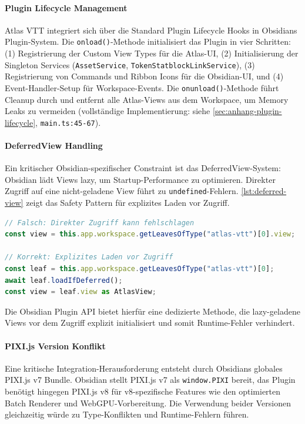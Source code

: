 \paragraph{Plugin Lifecycle Management}

Atlas \ac{VTT} integriert sich über die Standard Plugin Lifecycle Hooks in Obsidians Plugin-System. Die \texttt{onload()}-Methode initialisiert das Plugin in vier Schritten: (1) Registrierung der Custom View Types für die Atlas-\ac{UI}, (2) Initialisierung der Singleton Services (\texttt{AssetService}, \texttt{TokenStatblockLinkService}), (3) Registrierung von Commands und Ribbon Icons für die Obsidian-\ac{UI}, und (4) Event-Handler-Setup für Workspace-Events. Die \texttt{onunload()}-Methode führt Cleanup durch und entfernt alle Atlas-Views aus dem Workspace, um Memory Leaks zu vermeiden (vollständige Implementierung: siehe \autoref{sec:anhang-plugin-lifecycle}, \texttt{main.ts:45-67}).

\paragraph{DeferredView Handling}

Ein kritischer Obsidian-spezifischer Constraint ist das DeferredView-System: Obsidian lädt Views lazy, um Startup-Performance zu optimieren. Direkter Zugriff auf eine nicht-geladene View führt zu \texttt{undefined}-Fehlern. \autoref{lst:deferred-view} zeigt das Safety Pattern für explizites Laden vor Zugriff.

\begin{lstlisting}[float,language=TypeScript,caption={DeferredView Safety Pattern},label=lst:deferred-view]
// Falsch: Direkter Zugriff kann fehlschlagen
const view = this.app.workspace.getLeavesOfType("atlas-vtt")[0].view;

// Korrekt: Explizites Laden vor Zugriff
const leaf = this.app.workspace.getLeavesOfType("atlas-vtt")[0];
await leaf.loadIfDeferred();
const view = leaf.view as AtlasView;
\end{lstlisting}

Die Obsidian Plugin \ac{API} bietet hierfür eine dedizierte Methode, die lazy-geladene Views vor dem Zugriff explizit initialisiert und somit Runtime-Fehler verhindert.

\paragraph{PIXI.js Version Konflikt}

Eine kritische Integration-Herausforderung entsteht durch Obsidians globales PIXI.js v7 Bundle. Obsidian stellt PIXI.js v7 als \texttt{window.PIXI} bereit, das Plugin benötigt hingegen PIXI.js v8 für v8-spezifische Features wie den optimierten Batch Renderer und WebGPU-Vorbereitung. Die Verwendung beider Versionen gleichzeitig würde zu Type-Konflikten und Runtime-Fehlern führen.

